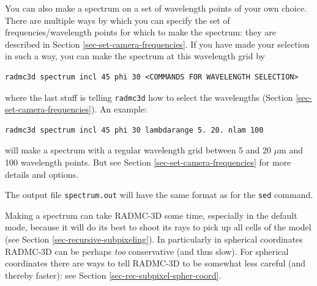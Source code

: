 \documentclass{report}
\newenvironment{asciibox}%
  {\begin{list}{}{%
    \setlength{\topsep}{0.5em}%
    \setlength{\parskip}{0em}%
    \setlength{\parsep}{0em}%
    \setlength{\itemsep}{0em}%
    \setlength{\rightmargin}{0em}%
    \setlength{\leftmargin}{3.0em}%
    \setlength{\labelsep}{1em}%
    \setlength{\labelwidth}{2em}%
  }\normalfont\footnotesize\item}
  {\end{list}}
\begin{document}
You can also make a spectrum on a set of wavelength points of your own
choice. There are multiple ways by which you can specify the set of
frequencies/wavelength points for which to make the spectrum: they are
described in Section \ref{sec-set-camera-frequencies}. If you have made
your selection in such a way, you can make the spectrum at this wavelength
grid by 
\begin{asciibox}\begin{verbatim}
radmc3d spectrum incl 45 phi 30 <COMMANDS FOR WAVELENGTH SELECTION>
\end{verbatim}\end{asciibox}
where the last stuff is telling {\small\tt radmc3d} how to select the
wavelengths (Section \ref{sec-set-camera-frequencies}). An example:
\begin{asciibox}\begin{verbatim}
radmc3d spectrum incl 45 phi 30 lambdarange 5. 20. nlam 100
\end{verbatim}\end{asciibox}
will make a spectrum with a regular wavelength grid between 5 and 20 $\mu$m
and 100 wavelength points. But see Section \ref{sec-set-camera-frequencies}
for more details and options.

The output file {\small\tt spectrum.out} will have the same format as
for the {\small\tt sed} command.

Making a spectrum can take RADMC-3D some time, especially in the default
mode, because it will do its best to shoot its rays to pick up all cells of
the model (see Section \ref{sec-recursive-subpixeling}). In particularly
in spherical coordinates RADMC-3D can be perhaps {\em too} conservative (and
thus slow). For spherical coordinates there are ways to tell RADMC-3D to be
somewhat less careful (and thereby faster): see Section
\ref{sec-rec-subpixel-spher-coord}.
\end{document}
